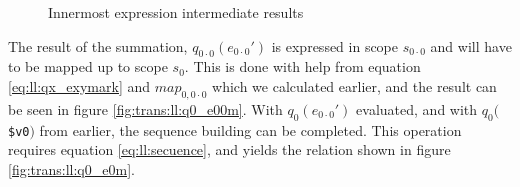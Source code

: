 \begin{figure}[!h]
\centering
{}
\caption{Innermost expression intermediate results \label{fig:trans:ll:innerExpr}}
\end{figure}

The result of the summation, $q_{0\cdot 0}(e_{0\cdot0}')$ is expressed in scope $s_{0 \cdot 0}$ and will have to
be mapped up to scope $s_{0}$. This is done with help from equation \ref{eq:ll:qx_exymark} and $map_{0, 0\cdot 0}$
which we calculated earlier, and the result can be seen in figure \ref{fig:trans:ll:q0_e00m}. With
$q_{0}(e_{0\cdot0}')$ evaluated, and with $q_{0}($\texttt{\$v0}$)$ from earlier, the sequence building can be completed. This operation requires
equation \ref{eq:ll:secuence}, and yields the relation shown in figure \ref{fig:trans:ll:q0_e0m}.

